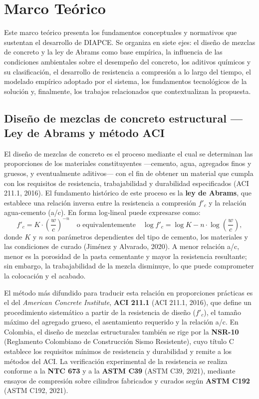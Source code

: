 \section{Marco Teórico}

Este marco teórico presenta los fundamentos conceptuales y normativos que sustentan el desarrollo de DIAPCE. Se organiza en siete ejes: el diseño de mezclas de concreto y la ley de Abrams como base empírica, la influencia de las condiciones ambientales sobre el desempeño del concreto, los aditivos químicos y su clasificación, el desarrollo de resistencia a compresión a lo largo del tiempo, el modelado empírico adoptado por el sistema, los fundamentos tecnológicos de la solución y, finalmente, los trabajos relacionados que contextualizan la propuesta.

\subsection{Diseño de mezclas de concreto estructural — Ley de Abrams y método ACI}

El diseño de mezclas de concreto es el proceso mediante el cual se determinan las proporciones de los materiales constituyentes ---cemento, agua, agregados finos y gruesos, y eventualmente aditivos--- con el fin de obtener un material que cumpla con los requisitos de resistencia, trabajabilidad y durabilidad especificados (ACI 211.1, 2016). El fundamento histórico de este proceso es la \textbf{ley de Abrams}, que establece una relación inversa entre la resistencia a compresión $f'_c$ y la relación agua-cemento (a/c). En forma log-lineal puede expresarse como:
\[
f'_c = K \cdot \left(\frac{w}{c}\right)^{-n}
\quad\text{o equivalentemente}\quad
\log f'_c = \log K - n \cdot \log\!\left(\frac{w}{c}\right),
\]
donde $K$ y $n$ son parámetros dependientes del tipo de cemento, los materiales y las condiciones de curado (Jiménez y Alvarado, 2020). A menor relación a/c, menor es la porosidad de la pasta cementante y mayor la resistencia resultante; sin embargo, la trabajabilidad de la mezcla disminuye, lo que puede comprometer la colocación y el acabado.

El método más difundido para traducir esta relación en proporciones prácticas es el del \textit{American Concrete Institute}, \textbf{ACI 211.1} (ACI 211.1, 2016), que define un procedimiento sistemático a partir de la resistencia de diseño ($f'_c$), el tamaño máximo del agregado grueso, el asentamiento requerido y la relación a/c. En Colombia, el diseño de mezclas estructurales también se rige por la \textbf{NSR-10} (Reglamento Colombiano de Construcción Sismo Resistente), cuyo título C establece los requisitos mínimos de resistencia y durabilidad y remite a los métodos del ACI. La verificación experimental de la resistencia se realiza conforme a la \textbf{NTC 673} y a la \textbf{ASTM C39} (ASTM C39, 2021), mediante ensayos de compresión sobre cilindros fabricados y curados según \textbf{ASTM C192} (ASTM C192, 2021).

